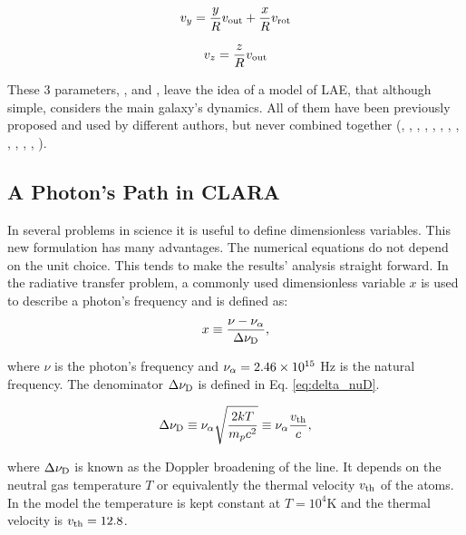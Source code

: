 \documentclass[twocolappendix]{latex/emulateapj}
\begin{document}
\begin{equation}
	v_{y}=\frac{y}{R}v_{\rm out}+\frac{x}{R}v_{\rm rot} 
	\label{eq:vy}
\end{equation}

\begin{equation}
	v_{z}=\frac{z}{R}v_{\rm out}
	\label{eq:vz}
\end{equation}

These 3 parameters, \vrot, \vout and \tauh, leave the idea of a model of LAE, that although simple, considers the main galaxy's dynamics. All of them have been previously proposed and used by different authors, but never combined together (\cite{Adams72}, \cite{Harrington73}, \cite{Neufeld90}, \cite{Dijkstra06}, \cite{Verhamme06}, \cite{Forero12}, \cite{Martin2015}, \cite{Garavito14}, \cite{Neufeld91}, \cite{Laursen09}, \cite{Barnes11}, \cite{Verhamme12}, \cite{Yajima12}).\\

\subsection{A \lya Photon's Path in CLARA}
In several problems in science it is useful to define dimensionless variables. This new formulation has many advantages. The numerical equations do not depend on the unit choice. This tends to make the results' analysis straight forward. In the \lya radiative transfer problem, a commonly used dimensionless variable $x$ is used to describe a photon's frequency and is defined as:\\

\begin{equation}
	\label{eq:x_freq}
	x \equiv \frac{\nu -\nu_{\rm \alpha}}{\Delta\nu_{\rm D}},
\end{equation} 

where $\nu$ is the photon's frequency and $\nu_{\rm \alpha} = 2.46\times 10^{15}$ Hz is the \lya natural frequency. The denominator $\Delta\nu_{\rm D}$ is defined in Eq. \ref{eq:delta_nuD}.

\begin{equation}
	\label{eq:delta_nuD}
	\Delta\nu_{\rm D} \equiv \nu_{\rm \alpha}\sqrt{\frac{2kT}{m_pc^2}} \equiv \nu_{\rm \alpha} \frac{v_{\rm th}}{c},
\end{equation} 

where $\Delta\nu_{\rm D}$ is known as the Doppler broadening of the \lya line. It depends on the neutral gas temperature $T$ or equivalently the thermal velocity $v_{\rm th}$ of the atoms. In the model the temperature is kept constant at $T=10^4$K and the thermal velocity is $v_{\rm th}=12.8$\kms. \\
\end{document}
